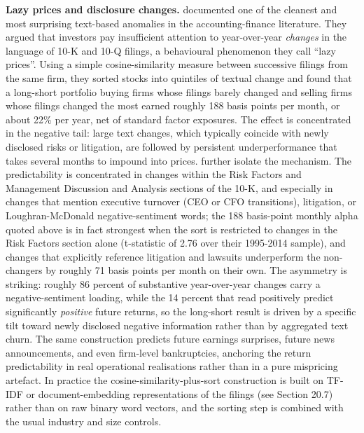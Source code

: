\textbf{Lazy prices and disclosure changes.} \cite{cohen2020lazy} documented one of the cleanest and most surprising text-based anomalies in the accounting-finance literature. They argued that investors pay insufficient attention to year-over-year \textit{changes} in the language of 10-K and 10-Q filings, a behavioural phenomenon they call ``lazy prices''. Using a simple cosine-similarity measure between successive filings from the same firm, they sorted stocks into quintiles of textual change and found that a long-short portfolio buying firms whose filings barely changed and selling firms whose filings changed the most earned roughly 188 basis points per month, or about 22\% per year, net of standard factor exposures. The effect is concentrated in the negative tail: large text changes, which typically coincide with newly disclosed risks or litigation, are followed by persistent underperformance that takes several months to impound into prices. \cite{cohen2020lazy} further isolate the mechanism. The predictability is concentrated in changes within the Risk Factors and Management Discussion and Analysis sections of the 10-K, and especially in changes that mention executive turnover (CEO or CFO transitions), litigation, or Loughran-McDonald negative-sentiment words; the 188 basis-point monthly alpha quoted above is in fact strongest when the sort is restricted to changes in the Risk Factors section alone (t-statistic of 2.76 over their 1995-2014 sample), and changes that explicitly reference litigation and lawsuits underperform the non-changers by roughly 71 basis points per month on their own. The asymmetry is striking: roughly 86 percent of substantive year-over-year changes carry a negative-sentiment loading, while the 14 percent that read positively predict significantly \textit{positive} future returns, so the long-short result is driven by a specific tilt toward newly disclosed negative information rather than by aggregated text churn. The same construction predicts future earnings surprises, future news announcements, and even firm-level bankruptcies, anchoring the return predictability in real operational realisations rather than in a pure mispricing artefact. In practice the cosine-similarity-plus-sort construction is built on TF-IDF or document-embedding representations of the filings (see Section 20.7) rather than on raw binary word vectors, and the sorting step is combined with the usual industry and size controls.

